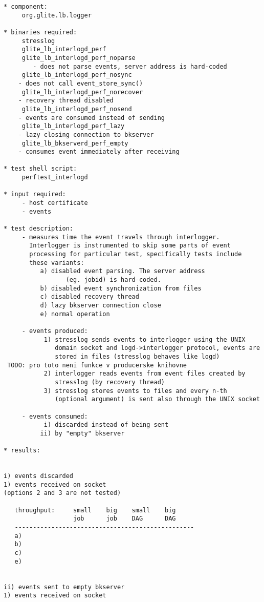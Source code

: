 \begin{verbatim}
* component:
     org.glite.lb.logger

* binaries required:
     stresslog
     glite_lb_interlogd_perf
     glite_lb_interlogd_perf_noparse
        - does not parse events, server address is hard-coded
     glite_lb_interlogd_perf_nosync
	- does not call event_store_sync()
     glite_lb_interlogd_perf_norecover
	- recovery thread disabled
     glite_lb_interlogd_perf_nosend
	- events are consumed instead of sending
     glite_lb_interlogd_perf_lazy
	- lazy closing connection to bkserver
     glite_lb_bkserverd_perf_empty
	- consumes event immediately after receiving

* test shell script:
     perftest_interlogd

* input required:
     - host certificate
     - events

* test description:
     - measures time the event travels through interlogger.
       Interlogger is instrumented to skip some parts of event
       processing for particular test, specifically tests include
       these variants:
	      a) disabled event parsing. The server address
                 (eg. jobid) is hard-coded.
	      b) disabled event synchronization from files
	      c) disabled recovery thread
	      d) lazy bkserver connection close
	      e) normal operation

     - events produced:
           1) stresslog sends events to interlogger using the UNIX
              domain socket and logd->interlogger protocol, events are
              stored in files (stresslog behaves like logd)
 TODO: pro toto neni funkce v producerske knihovne
           2) interlogger reads events from event files created by
              stresslog (by recovery thread)
           3) stresslog stores events to files and every n-th
              (optional argument) is sent also through the UNIX socket

     - events consumed:
           i) discarded instead of being sent
          ii) by "empty" bkserver

* results:


i) events discarded
1) events received on socket
(options 2 and 3 are not tested)

   throughput:     small    big    small    big
                   job      job    DAG      DAG
   -------------------------------------------------
   a)
   b)
   c)
   e)


ii) events sent to empty bkserver
1) events received on socket


\end{verbatim}
